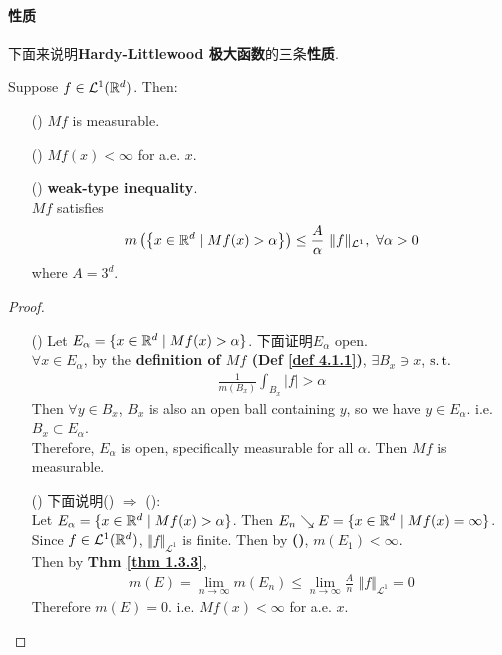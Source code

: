 \paragraph{性质}
	下面来说明\textbf{Hardy-Littlewood 极大函数}的三条\textbf{性质}.
	\begin{proposition}\label{prop 4.1.1}
		Suppose $f \in \mathcal{L}^{1}(\mathbb{R}^d)$. Then:
		\begin{enumerate}
			\item[(\rmnum{1})]$Mf$ is measurable.
			
			\item[(\rmnum{2})]$Mf(x) < \infty$ for a.e. $x$.
			
			\item[(\rmnum{3})]\textbf{weak-type inequality}. \\
			$Mf$ satisfies
			\begin{align}
				m\left( \left\{ x \in \mathbb{R}^d \mid Mf(x) > \alpha \right\} \right) 
				\leq \frac{A}{\alpha} \,\, \Vert f \Vert_{\mathcal{L}^1} , \,\, \forall \alpha > 0
			\end{align}
			where $A = 3^d$.
		\end{enumerate}
	
		\vspace{4em}
		\begin{proof}
			\begin{enumerate}
				\item [(\rmnum{1})]Let $E_\alpha = \{ x \in \mathbb{R}^d \mid Mf(x) > \alpha \}$. 下面证明$E_\alpha$ open. \\
				$\forall x \in E_\alpha$, by the \textbf{definition of $Mf$ (Def \ref{def 4.1.1})}, $\exists B_x \ni x$, $\operatorname{s.t.}$
				\begin{align}
					\frac{1}{m(B_x)} \int_{B_x}{\left| f \right|} > \alpha
				\end{align}
				Then $\forall y \in B_x$, $B_x$ is also an open ball containing $y$, so we have $y \in E_\alpha$. i.e. $B_x \subset E_\alpha$. \\
				Therefore, $E_\alpha$ is open, specifically measurable for all $\alpha$. Then $Mf$ is measurable.
				
				\newpage
				
				\item[(\rmnum{2})]下面说明() $\Rightarrow$ (): \\
				Let $E_\alpha = \{ x \in \mathbb{R}^d \mid Mf(x) > \alpha \}$. Then $E_n \searrow E = \{ x \in \mathbb{R}^d \mid Mf(x) = \infty \}$. \\
				Since $f \in \mathcal{L}^{1}(\mathbb{R}^d)$, $\Vert f \Vert_{\mathcal{L}^1}$ is finite. Then by \textbf{()}, $m(E_1) < \infty$. \\
				Then by \textbf{Thm \ref{thm 1.3.3}},
				\begin{align}
					m(E) = \lim_{n \to \infty}{m(E_n)} \leq \lim_{n \to \infty}{\frac{A}{n} \,\, \Vert f \Vert_{\mathcal{L}^1}} = 0
				\end{align}
				Therefore $m(E) = 0$. i.e. $Mf(x) < \infty$ for a.e. $x$.
				

\end{enumerate}
\end{proof}
\end{proposition}
